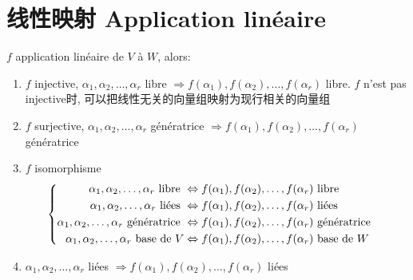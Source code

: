 \documentclass{book}
\begin{document}
\chapter{线性映射 Application lin\'eaire}
$f$ application lin\'eaire de $V$ \`a $W$, alors:
\begin{enumerate}
\item $f$ injective, $\alpha_1, \alpha_2, \ldots, \alpha_r$ libre $\Rightarrow f(\alpha_1), f(\alpha_2), \ldots, f(\alpha_r)$ libre.
	$f$ n'est pas injective时, 可以把线性无关的向量组映射为现行相关的向量组
\item $f$ surjective, $\alpha_1, \alpha_2, \ldots, \alpha_r$ g\'en\'eratrice $\Rightarrow f(\alpha_1), f(\alpha_2), \ldots, f(\alpha_r)$ g\'en\'eratrice 
\item $f$ isomorphisme
	$$
	\begin{cases}
	\begin{aligned}
			\alpha_1, \alpha_2, \ldots, \alpha_r \text{ libre } & \Leftrightarrow f(\alpha_1), f(\alpha_2), \ldots, f(\alpha_r) \text{ libre } \\
	\alpha_1, \alpha_2, \ldots, \alpha_r \text{ li\'ees } & \Leftrightarrow f(\alpha_1), f(\alpha_2), \ldots, f(\alpha_r) \text{ li\'ees } \\
	\alpha_1, \alpha_2, \ldots, \alpha_r \text{ g\'en\'eratrice } & \Leftrightarrow f(\alpha_1), f(\alpha_2), \ldots, f(\alpha_r) \text{ g\'en\'eratrice } \\
	\alpha_1, \alpha_2, \ldots, \alpha_r \text{ base de } V & \Leftrightarrow f(\alpha_1), f(\alpha_2), \ldots, f(\alpha_r) \text{ base de } W
	\end{aligned}
	\end{cases}
	$$
\item $\alpha_1, \alpha_2, \ldots, \alpha_r$ li\'ees $\Rightarrow f(\alpha_1), f(\alpha_2), \ldots, f(\alpha_r)$ li\'ees
\end{enumerate}
\end{document}
